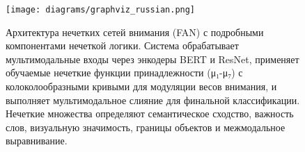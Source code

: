\begin{figure}[htbp]
    \centering
    \texttt{[image: diagrams/graphviz\_russian.png]}
    \caption{Архитектура нечетких сетей внимания (FAN) с подробными компонентами нечеткой логики. Система обрабатывает мультимодальные входы через энкодеры BERT и ResNet, применяет обучаемые нечеткие функции принадлежности (μ₁-μ₇) с колоколообразными кривыми для модуляции весов внимания, и выполняет мультимодальное слияние для финальной классификации. Нечеткие множества определяют семантическое сходство, важность слов, визуальную значимость, границы объектов и межмодальное выравнивание.}
    \label{fig:fan_architecture_russian}
\end{figure}
